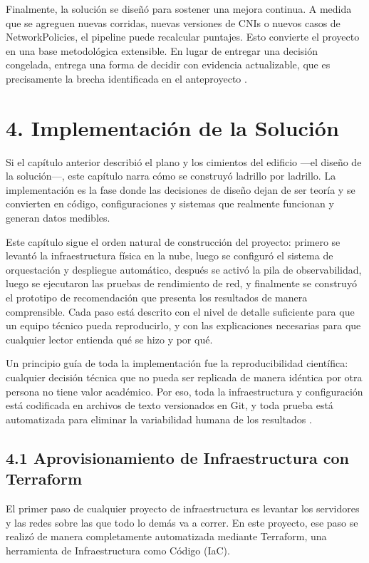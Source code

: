\documentclass[journal]{IEEEtran}
\begin{document}
Finalmente, la solución se diseñó para sostener una mejora continua. A medida que se agreguen nuevas corridas, nuevas versiones de CNIs o nuevos casos de NetworkPolicies, el pipeline puede recalcular puntajes. Esto convierte el proyecto en una base metodológica extensible. En lugar de entregar una decisión congelada, entrega una forma de decidir con evidencia actualizable, que es precisamente la brecha identificada en el anteproyecto \cite{ref29}.


\section{4. Implementación de la Solución}

Si el capítulo anterior describió el plano y los cimientos del edificio ---el diseño de la solución---, este capítulo narra cómo se construyó ladrillo por ladrillo. La implementación es la fase donde las decisiones de diseño dejan de ser teoría y se convierten en código, configuraciones y sistemas que realmente funcionan y generan datos medibles.

Este capítulo sigue el orden natural de construcción del proyecto: primero se levantó la infraestructura física en la nube, luego se configuró el sistema de orquestación y despliegue automático, después se activó la pila de observabilidad, luego se ejecutaron las pruebas de rendimiento de red, y finalmente se construyó el prototipo de recomendación que presenta los resultados de manera comprensible. Cada paso está descrito con el nivel de detalle suficiente para que un equipo técnico pueda reproducirlo, y con las explicaciones necesarias para que cualquier lector entienda qué se hizo y por qué.

Un principio guía de toda la implementación fue la reproducibilidad científica: cualquier decisión técnica que no pueda ser replicada de manera idéntica por otra persona no tiene valor académico. Por eso, toda la infraestructura y configuración está codificada en archivos de texto versionados en Git, y toda prueba está automatizada para eliminar la variabilidad humana de los resultados \cite{ref7}.

\subsection{4.1 Aprovisionamiento de Infraestructura con Terraform}

El primer paso de cualquier proyecto de infraestructura es levantar los servidores y las redes sobre las que todo lo demás va a correr. En este proyecto, ese paso se realizó de manera completamente automatizada mediante Terraform, una herramienta de Infraestructura como Código (IaC).
\end{document}
